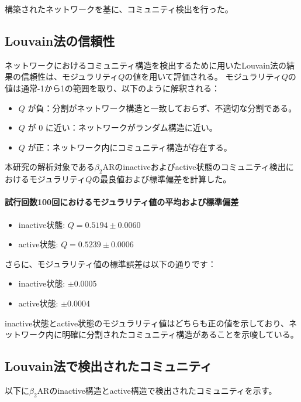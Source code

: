 構築されたネットワークを基に、コミュニティ検出を行った。
\subsection{Louvain法の信頼性}

ネットワークにおけるコミュニティ構造を検出するために用いたLouvain法の結果の信頼性は、モジュラリティ$Q$の値を用いて評価される。
モジュラリティ$Q$の値は通常-1から1の範囲を取り、以下のように解釈される：

\begin{itemize}
    \item \( Q \) が負：分割がネットワーク構造と一致しておらず、不適切な分割である。
    \item \( Q \) が 0 に近い：ネットワークがランダム構造に近い。
    \item \( Q \) が正：ネットワーク内にコミュニティ構造が存在する。
\end{itemize}

本研究の解析対象である$\beta_2$ARのinactiveおよびactive状態のコミュニティ検出におけるモジュラリティ$Q$の最良値および標準偏差を計算した。

\paragraph{試行回数100回におけるモジュラリティ値の平均および標準偏差}
\begin{itemize}
    \item inactive状態: \( Q = 0.5194 \pm 0.0060 \)
    \item active状態: \( Q = 0.5239 \pm 0.0006 \)
\end{itemize}
さらに、モジュラリティ値の標準誤差は以下の通りです：
\begin{itemize}
    \item inactive状態: \( \pm 0.0005 \)
    \item active状態: \( \pm 0.0004 \)
\end{itemize}

inactive状態とactive状態のモジュラリティ値はどちらも正の値を示しており、ネットワーク内に明確に分割されたコミュニティ構造があることを示唆している。

\subsection{Louvain法で検出されたコミュニティ}

以下に$\beta_2$ARのinactive構造とactive構造で検出されたコミュニティを示す。

